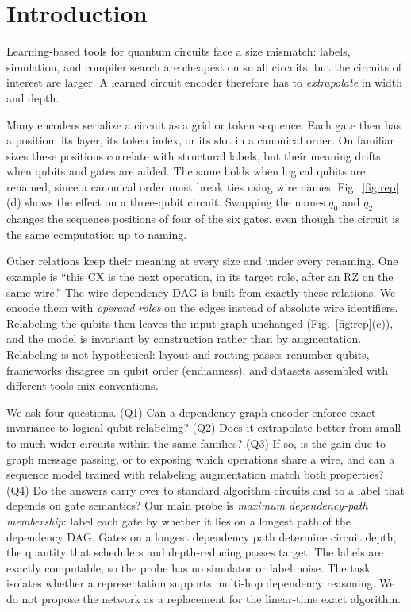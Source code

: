 \documentclass[conference,a4paper]{IEEEtran}
\begin{document}
\section{Introduction}

Learning-based tools for quantum circuits face a size mismatch: labels, simulation, and compiler search are cheapest on small circuits, but the circuits of interest are larger. A learned circuit encoder therefore has to \emph{extrapolate} in width and depth.

Many encoders serialize a circuit as a grid or token sequence. Each gate then has a position: its layer, its token index, or its slot in a canonical order. On familiar sizes these positions correlate with structural labels, but their meaning drifts when qubits and gates are added. The same holds when logical qubits are renamed, since a canonical order must break ties using wire names. Fig.~\ref{fig:rep}(d) shows the effect on a three-qubit circuit. Swapping the names $q_0$ and $q_2$ changes the sequence positions of four of the six gates, even though the circuit is the same computation up to naming.

Other relations keep their meaning at every size and under every renaming. One example is ``this CX is the next operation, in its target role, after an RZ on the same wire.'' The wire-dependency DAG is built from exactly these relations. We encode them with \emph{operand roles} on the edges instead of absolute wire identifiers. Relabeling the qubits then leaves the input graph unchanged (Fig.~\ref{fig:rep}(c)), and the model is invariant by construction rather than by augmentation. Relabeling is not hypothetical: layout and routing passes renumber qubits, frameworks disagree on qubit order (endianness), and datasets assembled with different tools mix conventions.

We ask four questions. (Q1) Can a dependency-graph encoder enforce exact invariance to logical-qubit relabeling? (Q2) Does it extrapolate better from small to much wider circuits within the same families? (Q3) If so, is the gain due to graph message passing, or to exposing which operations share a wire, and can a sequence model trained with relabeling augmentation match both properties? (Q4) Do the answers carry over to standard algorithm circuits and to a label that depends on gate semantics? Our main probe is \emph{maximum dependency-path membership}: label each gate by whether it lies on a longest path of the dependency DAG. Gates on a longest dependency path determine circuit depth, the quantity that schedulers and depth-reducing passes target. The labels are exactly computable, so the probe has no simulator or label noise. The task isolates whether a representation supports multi-hop dependency reasoning. We do not propose the network as a replacement for the linear-time exact algorithm.
\end{document}
